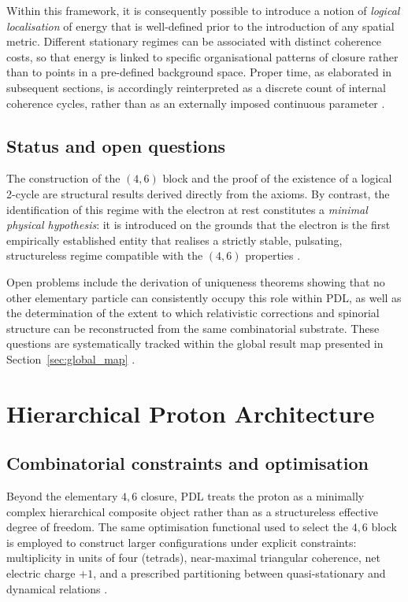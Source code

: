 \documentclass{article}
\begin{document}
Within this framework, it is consequently possible to introduce a notion of \emph{logical localisation} of energy that is well-defined prior to the introduction of any spatial metric. Different stationary regimes can be associated with distinct coherence costs, so that energy is linked to specific organisational patterns of closure rather than to points in a pre-defined background space. Proper time, as elaborated in subsequent sections, is accordingly reinterpreted as a discrete count of internal coherence cycles, rather than as an externally imposed continuous parameter \citep{PDL_Main_2026,PDL_position}.

\subsection{Status and open questions}
\label{subsec:electron_status}

The construction of the \((4,6)\) block and the proof of the existence of a logical 2-cycle are structural results derived directly from the axioms. By contrast, the identification of this regime with the electron at rest constitutes a \emph{minimal physical hypothesis}: it is introduced on the grounds that the electron is the first empirically established entity that realises a strictly stable, pulsating, structureless regime compatible with the \((4,6)\) properties \citep{PDL_intro}.

Open problems include the derivation of uniqueness theorems showing that no other elementary particle can consistently occupy this role within PDL, as well as the determination of the extent to which relativistic corrections and spinorial structure can be reconstructed from the same combinatorial substrate. These questions are systematically tracked within the global result map presented in Section~\ref{sec:global_map} \citep{PDL_position}.

\section{Hierarchical Proton Architecture}
\label{sec:proton_architecture}

\subsection{Combinatorial constraints and optimisation}
\label{subsec:proton_constraints}

Beyond the elementary \(4,6\) closure, PDL treats the proton as a minimally complex hierarchical composite object rather than as a structureless effective degree of freedom. The same optimisation functional used to select the \(4,6\) block is employed to construct larger configurations under explicit constraints: multiplicity in units of four (tetrads), near-maximal triangular coherence, net electric charge \(+1\), and a prescribed partitioning between quasi-stationary and dynamical relations \citep{PDL_Main_2026,Combinatorial_Proton_v2_2026}.
\end{document}
